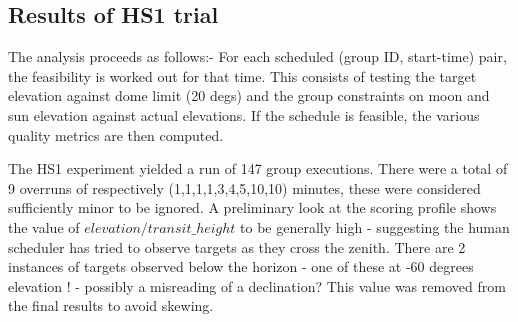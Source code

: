 \subsection{Results of HS1 trial}
The analysis proceeds as follows:- For each scheduled (group ID, start-time) pair, the feasibility is worked out for that time. This consists of testing the target elevation against dome limit (20 degs) and the group constraints on moon and sun elevation against actual elevations. If the schedule is feasible, the various quality metrics are then computed.

The HS1 experiment yielded a run of 147 group executions. There were a total of 9 overruns of respectively (1,1,1,1,3,4,5,10,10) minutes, these were considered sufficiently minor to be ignored. A preliminary look at the scoring profile shows the value of $elevation/transit\_height$ to be generally high - suggesting the human scheduler has tried to observe targets as they cross the zenith. There are 2 instances of targets observed below the horizon - one of these at -60 degrees elevation ! - possibly a misreading of a declination? This value was removed from the final results to avoid skewing.

\clearpage

